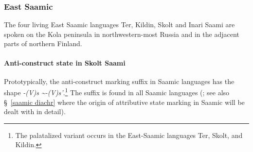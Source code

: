 \subsubsection{East Saamic}
The four living East Saamic languages Ter, Kildin, Skolt and Inari Saami are spoken on the Kola peninsula in northwestern-most Russia and in the adjacent parts of northern Finland.

\paragraph{Anti-construct state in Skolt Saami}%
Prototypically, the anti-construct marking suffix in Saamic languages has the shape \textit{-(V)s \textasciitilde-(V)s'}.\footnote{The palatalized variant occurs in the East-Saamic languages Ter, Skolt, and Kildin.} The suffix is found in all Saamic languages (\citealt{riesler2006b}; see also \S~\ref{saamic diachr} where the origin of attributive state marking in Saamic will be dealt with in detail). 


